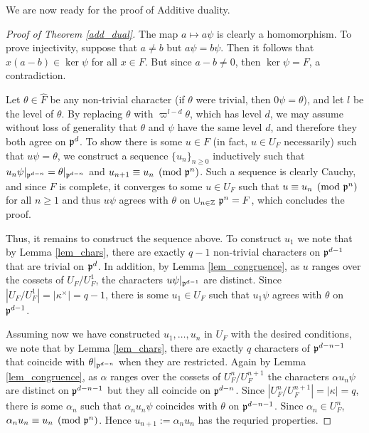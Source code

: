 We are now ready for the proof of Additive duality.

\begin{proof}[Proof of Theorem \ref{add_dual}]
    The map $a\mapsto a\psi$ is clearly a homomorphism. To prove injectivity, suppose that $a\neq b$ but $a\psi=b\psi$. Then it follows that $x(a-b)\in\ker\psi$ for all $x\in F$. But since $a-b\neq 0$, then $\ker\psi=F$, a contradiction.

    Let $\theta\in\hat{F}$ be any non-trivial character (if $\theta$ were trivial, then $0\psi=\theta$), and let $l$ be the level of $\theta$. By replacing $\theta$ with $\varpi^{l-d}\theta$, which has level $d$, we may assume without loss of generality that $\theta$ and $\psi$ have the same level $d$, and therefore they both agree on $\mathfrak{p}^d$. To show there is some $u\in F$ (in fact, $u\in U_F$ necessarily) such that $u\psi=\theta$,   we construct a sequence $\{u_n\}_{n\geq0}$ inductively such that $u_n\psi|_{\mathfrak{p}^{d-n}}=\theta|_{\mathfrak{p}^{d-n}}$ and $u_{n+1}\equiv u_n\pmod{\mathfrak{p}^n}$. Such a sequence is clearly Cauchy, and since $F$ is complete, it converges to some $u\in U_F$ such that $u\equiv u_n\pmod{\mathfrak{p}^n}$ for all $n\geq 1$ and thus $u\psi$ agrees with $\theta$ on $\cup_{n\in\mathbb{Z}}\ \mathfrak{p}^n=F$, which concludes the proof.

    Thus, it remains to construct the sequence above. To construct $u_1$ we note that by Lemma \ref{lem_chars}, there are exactly $q-1$ non-trivial characters on $\mathfrak{p}^{d-1}$ that are trivial on $\mathfrak{p}^d$. In addition, by Lemma \ref{lem_congruence}, as $u$ ranges over the cossets of $U_F/U_F^1$, the characters $u\psi|_{\mathfrak{p}^{d-1}}$ are distinct. Since $|U_F/U_F^1|=|\kappa^{\times}|=q-1$, there is some $u_1\in U_F$ such that $u_1\psi$ agrees with $\theta$ on $\mathfrak{p}^{d-1}$. 
    
    Assuming now we have constructed $u_1,\ldots,u_n$ in $U_F$ with the desired conditions, we note that by Lemma \ref*{lem_chars}, there are exactly $q$ characters of $\mathfrak{p}^{d-n-1}$ that coincide with $\theta|_{\mathfrak{p}^{d-n}}$ when they are restricted. Again by Lemma \ref*{lem_congruence}, as $\alpha$ ranges over the cossets of $U_F^n/U_F^{n+1}$ the characters $\alpha u_n\psi$ are distinct on $\mathfrak{p}^{d-n-1}$ but they all coincide on $\mathfrak{p}^{d-n}$. Since $|U_F^n/U_F^{n+1}|=|\kappa|=q$, there is some $\alpha_n$ such that $\alpha_n u_n\psi$ coincides with $\theta$ on $\mathfrak{p}^{d-n-1}$. Since $\alpha_n\in U_F^n$, $\alpha_n u_n\equiv u_n\pmod{\mathfrak{p}^n}$. Hence $u_{n+1}:=\alpha_n u_n$ has the requried properties.
\end{proof}